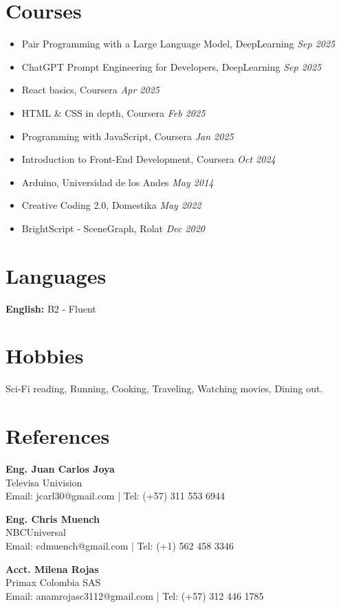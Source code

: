 \documentclass[11pt,a4paper]{article}
\begin{document}
\section*{Courses}
\begin{itemize}[leftmargin=*]
    \item Pair Programming with a Large Language Model, DeepLearning \hfill \textit{Sep 2025}
    \item ChatGPT Prompt Engineering for Developers, DeepLearning \hfill \textit{Sep 2025}
    \item React basics, Coursera \hfill \textit{Apr 2025}
    \item HTML \& CSS in depth, Coursera \hfill \textit{Feb 2025}
    \item Programming with JavaScript, Coursera \hfill \textit{Jan 2025}
    \item Introduction to Front-End Development, Coursera \hfill \textit{Oct 2024}
    \item Arduino, Universidad de los Andes \hfill \textit{May 2014}
    \item Creative Coding 2.0, Domestika \hfill \textit{May 2022}
    \item BrightScript - SceneGraph, Rolat \hfill \textit{Dec 2020}
\end{itemize}

\section*{Languages}
\textbf{English:} B2 - Fluent

\section*{Hobbies}
Sci-Fi reading, Running, Cooking, Traveling, Watching movies, Dining out.

\section*{References}
\textbf{Eng. Juan Carlos Joya} \\
Televisa Univision \\
Email: jcarl30@gmail.com | Tel: (+57) 311 553 6944

\textbf{Eng. Chris Muench} \\
NBCUniversal \\
Email: cdmuench@gmail.com | Tel: (+1) 562 458 3346

\textbf{Acct. Milena Rojas} \\
Primax Colombia SAS \\
Email: anamrojasc3112@gmail.com | Tel: (+57) 312 446 1785
\end{document}
